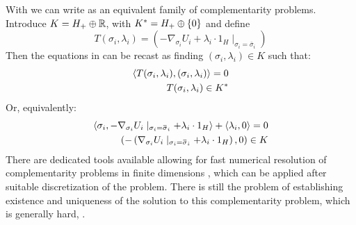 With  we can write  as an equivalent family of complementarity problems. Introduce $K = H_+ \oplus \mathbb{R}$, with $K^* = H_+ \oplus \{0\}$ and define
\begin{equation}
  T(\sigma_i, \lambda_i) = (-\nabla_{\sigma_i} U_i + \lambda_i \cdot 1_H \mid_{\sigma_i = \overbar{\sigma}_i})
\end{equation}
Then the equations in  can be recast as finding $(\sigma_i,\lambda_i) \in K$ such that:
\begin{equation}
  \label{eq:comp_form}
  \begin{split}
    \left \langle T(\sigma_i,\lambda_i),(\sigma_i,\lambda_i) \right \rangle = 0 \\
    T(\sigma_i,\lambda_i) \in K^*
  \end{split}
\end{equation}
Or, equivalently:
\begin{equation}
  \begin{split}
    \ip{\sigma_i}{-\nabla_{\sigma_i} U_i \mid_{\sigma_i = \overbar{\sigma}_i} + \lambda_i \cdot 1_H} + \ip{\lambda_i}{0}= 0 \\
    \pa{-\pa{\nabla_{\sigma_i} U_i \mid_{\sigma_i = \overbar{\sigma}_i} + \lambda_i \cdot 1_H}, 0} \in K
  \end{split}
\end{equation}
There are dedicated tools available allowing for fast numerical resolution of complementarity problems in finite dimensions \citep{acary2019introduction, dirkse1995path}, which can be applied after suitable discretization of the problem. There is still the problem of establishing existence and uniqueness of the solution to this complementarity problem, which is generally hard, \citep{hadjisavvas2006handbook}.

